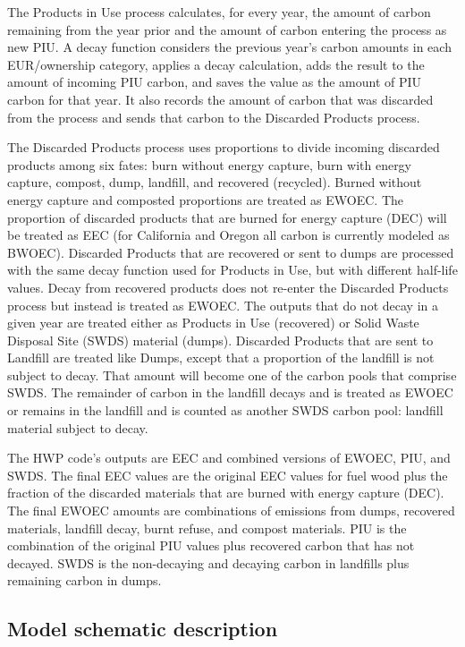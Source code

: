 \documentclass[
  openany]{book}
\begin{document}
The Products in Use process calculates, for every year, the amount of
carbon remaining from the year prior and the amount of carbon entering
the process as new PIU. A decay function considers the previous year's
carbon amounts in each EUR/ownership category, applies a decay
calculation, adds the result to the amount of incoming PIU carbon, and
saves the value as the amount of PIU carbon for that year. It also
records the amount of carbon that was discarded from the process and
sends that carbon to the Discarded Products process.

The Discarded Products process uses proportions to divide incoming
discarded products among six fates: burn without energy capture, burn
with energy capture, compost, dump, landfill, and recovered (recycled).
Burned without energy capture and composted proportions are treated as
EWOEC. The proportion of discarded products that are burned for energy
capture (DEC) will be treated as EEC (for California and Oregon all
carbon is currently modeled as BWOEC). Discarded Products that are
recovered or sent to dumps are processed with the same decay function
used for Products in Use, but with different half-life values. Decay
from recovered products does not re-enter the Discarded Products process
but instead is treated as EWOEC. The outputs that do not decay in a
given year are treated either as Products in Use (recovered) or Solid
Waste Disposal Site (SWDS) material (dumps). Discarded Products that are
sent to Landfill are treated like Dumps, except that a proportion of the
landfill is not subject to decay. That amount will become one of the
carbon pools that comprise SWDS. The remainder of carbon in the landfill
decays and is treated as EWOEC or remains in the landfill and is counted
as another SWDS carbon pool: landfill material subject to decay.

The HWP code's outputs are EEC and combined versions of EWOEC, PIU, and
SWDS. The final EEC values are the original EEC values for fuel wood
plus the fraction of the discarded materials that are burned with energy
capture (DEC). The final EWOEC amounts are combinations of emissions
from dumps, recovered materials, landfill decay, burnt refuse, and
compost materials. PIU is the combination of the original PIU values
plus recovered carbon that has not decayed. SWDS is the non-decaying and
decaying carbon in landfills plus remaining carbon in dumps.

\hypertarget{model-func-schdesc}{%
\subsection{Model schematic description}\label{model-func-schdesc}}
\end{document}
